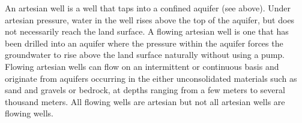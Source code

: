 An artesian well is a well that taps into a confined aquifer (see above). Under artesian pressure, water in the well rises above the top of the aquifer, but does not necessarily reach the land surface. A flowing artesian well is one that has been drilled into an aquifer where the pressure within the aquifer forces the groundwater to rise above the land surface naturally without using a pump. Flowing artesian wells can flow on an intermittent or continuous basis and originate from aquifers occurring in the either unconsolidated materials such as sand and gravels or bedrock, at depths ranging from a few meters to several thousand meters. All flowing wells are artesian but not all artesian wells are flowing wells.
